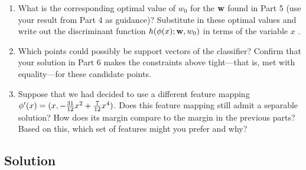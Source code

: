 \documentclass[submit]{harvardml}
\begin{document}
\begin{problem}
\begin{enumerate}
  \item What is the corresponding optimal value of $w_0$ for the $\mathbf{w}$ found in Part 5 (use your result from Part 4 as guidance)? Substitute in these optimal values and write out the discriminant function
    $h(\mathbf{\phi}(x);\mathbf{w},w_0)$ in terms of the variable $x$ .


\item Which points could possibly be support vectors of the classifier?  Confirm that
  your solution in Part 6 makes the constraints above tight---that is,
  met with equality---for these candidate points.

\item Suppose that we had decided to use a different feature mapping
    $\mathbf{\phi}'(x) = (x, -\frac{31}{12}x^2 + \frac{7}{12}x^4 )$.  Does
    this feature mapping still admit a separable solution?  How does
    its margin compare to the margin in the previous parts?  Based on
    this, which set of features might you prefer and why? 
    
\end{enumerate}

\end{problem}

\subsection*{Solution}

\newpage
\end{document}

